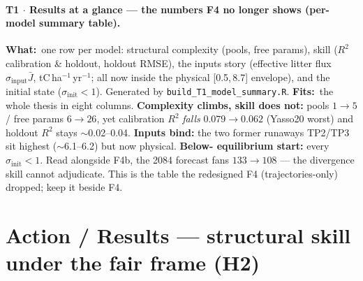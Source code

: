 \documentclass[10pt]{article}
\newcommand{\sinit}{\sigma_{\mathrm{init}}}
\newcommand{\sinput}{\sigma_{\mathrm{input}}}
\newcommand{\wh}[1]{\textbf{What:}~#1}
\newcommand{\ft}[1]{\textbf{Fits:}~#1}
\begin{document}
\paragraph{T1 $\cdot$ Results at a glance --- the numbers F4 no longer shows (per-model summary table).}
\begin{center}\small\normalsize\end{center}
\wh{one row per model: structural complexity (pools, free params), skill ($R^2$ calibration \& holdout, holdout
RMSE), the inputs story (effective litter flux $\sinput\bar J$, tC\,ha$^{-1}$\,yr$^{-1}$; all now inside the
physical [0.5,\,8.7] envelope), and the initial state ($\sinit<1$). Generated by \texttt{build\_T1\_model\_summary.R}.}
\ft{the whole thesis in eight columns. \textbf{Complexity climbs, skill does not:} pools $1\to5$ / free params
$6\to26$, yet calibration $R^2$ \emph{falls} $0.079\to0.062$ (Yasso20 worst) and holdout $R^2$ stays $\sim$0.02--0.04.
\textbf{Inputs bind:} the two former runaways TP2/TP3 sit highest ($\sim$6.1--6.2) but now physical. \textbf{Below-
equilibrium start:} every $\sinit<1$. Read alongside F4b, the 2084 forecast fans $133\to108$ --- the divergence
skill cannot adjudicate. This is the table the redesigned F4 (trajectories-only) dropped; keep it beside F4.}

\section*{Action / Results --- structural skill under the fair frame (H2)}
\end{document}

